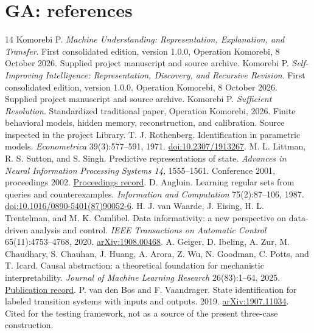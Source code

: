 \documentclass[11pt,oneside,openany]{book}
\numberwithin{equation}{section}
\begin{document}
\chapter{GA: references}
\begin{thebibliography}{14}\fontsize{9.5}{11}\selectfont\setlength{\itemsep}{3pt}\setlength{\parskip}{0pt}
 Komorebi P. \emph{Machine Understanding: Representation, Explanation, and Transfer}. First consolidated edition, version 1.0.0, Operation Komorebi, 8 October 2026. Supplied project manuscript and source archive.
 Komorebi P. \emph{Self-Improving Intelligence: Representation, Discovery, and Recursive Revision}. First consolidated edition, version 1.0.0, Operation Komorebi, 8 October 2026. Supplied project manuscript and source archive.
 Komorebi P. \emph{Sufficient Resolution}. Standardized traditional paper, Operation Komorebi, 2026. Finite behavioral models, hidden memory, reconstruction, and calibration. Source inspected in the project Library.
 T. J. Rothenberg. Identification in parametric models. \emph{Econometrica} 39(3):577--591, 1971. \href{https://www.jstor.org/stable/1913267}{doi:10.2307/1913267}.
 M. L. Littman, R. S. Sutton, and S. Singh. Predictive representations of state. \emph{Advances in Neural Information Processing Systems 14}, 1555--1561. Conference 2001, proceedings 2002. \href{https://papers.nips.cc/paper_files/paper/2001/hash/1e4d36177d71bbb3558e43af9577d70e-Abstract.html}{Proceedings record}.
 D. Angluin. Learning regular sets from queries and counterexamples. \emph{Information and Computation} 75(2):87--106, 1987. \href{https://doi.org/10.1016/0890-5401(87)90052-6}{doi:10.1016/0890-5401(87)90052-6}.
 H. J. van Waarde, J. Eising, H. L. Trentelman, and M. K. Camlibel. Data informativity: a new perspective on data-driven analysis and control. \emph{IEEE Transactions on Automatic Control} 65(11):4753--4768, 2020. \href{https://arxiv.org/abs/1908.00468}{arXiv:1908.00468}.
 A. Geiger, D. Ibeling, A. Zur, M. Chaudhary, S. Chauhan, J. Huang, A. Arora, Z. Wu, N. Goodman, C. Potts, and T. Icard. Causal abstraction: a theoretical foundation for mechanistic interpretability. \emph{Journal of Machine Learning Research} 26(83):1--64, 2025. \href{https://jmlr.org/papers/v26/23-0058.html}{Publication record}.
 P. van den Bos and F. Vaandrager. State identification for labeled transition systems with inputs and outputs. 2019. \href{https://arxiv.org/abs/1907.11034}{arXiv:1907.11034}. Cited for the testing framework, not as a source of the present three-case construction.

\end{thebibliography}
\end{document}
